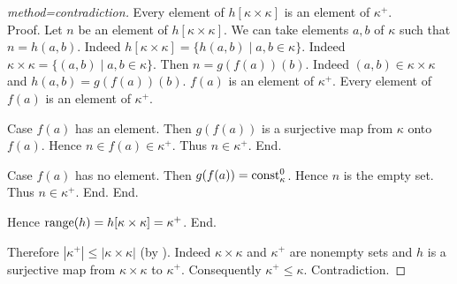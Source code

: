 \documentclass{article}
\begin{document}
\begin{forthel}
\begin{proof}[method=contradiction]
        Every element of $h[\kappa \times \kappa]$ is an element of $\kappa^+$. \\
        Proof.
          Let $n$ be an element of $h[\kappa \times \kappa]$.
          We can take elements $a, b$ of $\kappa$ such that $n = h(a,b)$.
          Indeed $h[\kappa \times \kappa] = \{h(a,b) \mid a,b \in \kappa\}$.
          Indeed $\kappa \times \kappa = \{(a,b) \mid a,b \in \kappa\}$.
          Then $n = g(f(a))(b)$.
          Indeed $(a,b) \in \kappa \times \kappa$ and $h(a,b) = g(f(a))(b)$.
          $f(a)$ is an element of $\kappa^+$.
          Every element of $f(a)$ is an element of $\kappa^+$.

          Case $f(a)$ has an element.
            Then $g(f(a))$ is a surjective map from $\kappa$ onto $f(a)$.
            Hence $n \in f(a) \in \kappa^+$.
            Thus $n \in \kappa^+$.
          End.

          Case $f(a)$ has no element.
            Then $g(f(a)) = \textrm{const}_{\kappa}^{0}$.
            Hence $n$ is the empty set.
            Thus $n \in \kappa^+$.
          End.
        End.

        Hence $\textrm{range}(h) = h[\kappa \times \kappa] = \kappa^+$.
      End.

      Therefore $|\kappa^+| \leq |\kappa \times \kappa|$ (by ).
      Indeed $\kappa \times \kappa$ and $\kappa^+$ are nonempty sets and $h$ is a surjective map from $\kappa \times \kappa$ to $\kappa^+$.
      Consequently $\kappa^+ \leq \kappa$.
      Contradiction.
    \end{proof}
  \end{forthel}

  \printbibliography
\end{document}
